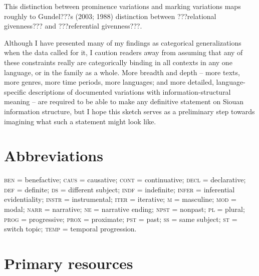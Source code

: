 \documentclass[output=paper]{LSP/langsci}
\begin{document}
This distinction between prominence variations and marking variations maps roughly to Gundel???s (2003; 1988) distinction between ???relational givenness??? and  ???referential givenness???.

Although I have presented many of my findings as categorical generalizations when the data called for it, I caution readers away from assuming that any of these constraints really are categorically binding in all contexts in any one language, or in the family as a whole. More breadth and depth -- more texts, more genres, more time periods, more languages; and more detailed, language-specific descriptions of documented variations with information-structural meaning -- are required to be able to make any definitive statement on Siouan information structure, but I hope this sketch serves as a preliminary step towards imagining what such a statement might look like.

\section* {Abbreviations}

\textsc{ben} = benefactive; \textsc{caus} = causative; \textsc{cont} = continuative; \textsc{decl} = declarative; \textsc{def} = definite; \textsc{ds} =  different subject; \textsc{indf} = indefinite; \textsc{infer} = inferential evidentiality; \textsc{instr} = instrumental; \textsc{iter} = iterative; \textsc{m} =  masculine; \textsc{mod} = modal; \textsc{narr} = narrative; \textsc{ne} = narrative ending; \textsc{npst} = nonpast; \textsc{pl} = plural; \textsc{prog} =  progressive; \textsc{prox} = proximate; \textsc{pst} = past; \textsc{ss} = same subject; \textsc{st} = switch topic; \textsc{temp} = temporal progression.

\section*{Primary resources}
\end{document}
